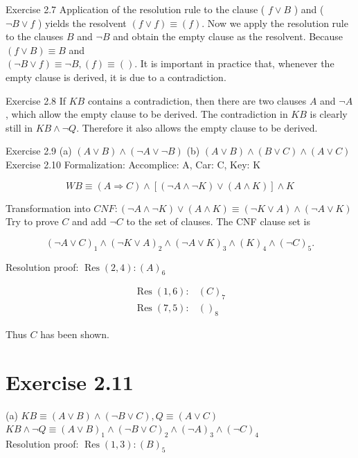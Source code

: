 \documentclass[10pt]{book}
\begin{document}
\begin{center}
\begin{enumerate}
\begin{center}
\begin{center}
\begin{center}
\begin{center}
\begin{center}
Exercise 2.7 Application of the resolution rule to the clause ( $f \vee B$ ) and ( $\neg B \vee f$ ) yields the resolvent $(f \vee f) \equiv(f)$. Now we apply the resolution rule to the clauses $B$ and $\neg B$ and obtain the empty clause as the resolvent. Because $(f \vee B) \equiv B$ and\\
$(\neg B \vee f) \equiv \neg B,(f) \equiv()$. It is important in practice that, whenever the empty clause is derived, it is due to a contradiction.


Exercise 2.8 If $K B$ contains a contradiction, then there are two clauses $A$ and $\neg A$, which allow the empty clause to be derived. The contradiction in $K B$ is clearly still in $K B \wedge \neg Q$. Therefore it also allows the empty clause to be derived.

Exercise 2.9 (a) $(A \vee B) \wedge(\neg A \vee \neg B)$ (b) $(A \vee B) \wedge(B \vee C) \wedge(A \vee C)$\\
Exercise 2.10 Formalization: Accomplice: A, Car: C, Key: K

$$
W B \equiv(A \Rightarrow C) \wedge[(\neg A \wedge \neg K) \vee(A \wedge K)] \wedge K
$$

Transformation into $C N F:(\neg A \wedge \neg K) \vee(A \wedge K) \equiv(\neg K \vee A) \wedge(\neg A \vee K)$\\
Try to prove $C$ and add $\neg C$ to the set of clauses. The CNF clause set is

$$
(\neg A \vee C)_{1} \wedge(\neg K \vee A)_{2} \wedge(\neg A \vee K)_{3} \wedge(K)_{4} \wedge(\neg C)_{5} .
$$

Resolution proof: $\operatorname{Res}(2,4):(A)_{6}$

$$
\begin{array}{ll}
\operatorname{Res}(1,6): & (C)_{7} \\
\operatorname{Res}(7,5): & ()_{8}
\end{array}
$$

Thus $C$ has been shown.

\section*{Exercise 2.11}
(a) $K B \equiv(A \vee B) \wedge(\neg B \vee C), Q \equiv(A \vee C)$\\
$K B \wedge \neg Q \equiv(A \vee B)_{1} \wedge(\neg B \vee C)_{2} \wedge(\neg A)_{3} \wedge(\neg C)_{4}$\\
Resolution proof: $\operatorname{Res}(1,3):(B)_{5}$


\end{center}
\end{center}
\end{center}
\end{center}
\end{center}
\end{enumerate}
\end{center}
\end{document}

